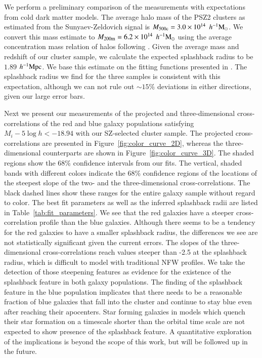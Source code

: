 \documentclass[iop, apjl, twocolappendix, numberedappendix]{emulateapj}
\def\mpch{h^{-1}{\rm Mpc}}
\def\msunh{h^{-1}{\rm M_{\odot}}}
\begin{document}
We perform a preliminary comparison of the measurements with
expectations from cold dark matter models. The average halo mass of
the PSZ2 clusters as estimated from the Sunyaev-Zeldovich signal
is $M_{\rm 500c}=3.0\times10^{14}$ $\msunh$. We convert this mass
estimate to $M_{\rm 200m}=6.2\times10^{14}$ $\msunh$ using the average
concentration mass relation of halos following
\citet{HuKravtsov:2003}. Given the average mass and redshift of our
cluster sample, we calculate the expected splashback radius to be
$1.89$ $\mpch$. We base this estimate on the fitting functions
presented in \citet{more2015splashback}. The splashback radius we
find for the three samples is consistent with this expectation,
although we can not rule out $\sim 15\%$ deviations in either directions,
given our large error bars.

Next we present our measurements of the projected and
three-dimensional cross-correlations of the red and blue galaxy populations
satisfying $M_{i}-5\log h<-18.94$ with our SZ-selected cluster
sample. The projected cross-correlations are presented in Figure~\ref{fig:color_curve_2D},
whereas the three-dimensional counterparts are shown in 
Figure~\ref{fig:color_curve_3D}. The shaded regions show
the 68\% confidence intervals from our fits. The vertical, shaded
bands with different colors indicate the 68\% confidence regions of
the locations of the steepest slope of the two- and the
three-dimensional cross-correlations. The black dashed lines show
these ranges for the entire galaxy sample without regard to color.
The best fit parameters as well as the inferred splashback radii are
listed in Table~\ref{tab:fit_parameters}. We
see that the red galaxies have a steeper cross-correlation profile
than the blue galaxies. Although there seems to be  a tendency for the red
galaxies to have a smaller splashback radius, the differences we see
are not statistically significant given the current errors. The
slopes of the three-dimensional cross-correlations reach values
steeper than -2.5 at the splashback radius, which is difficult to model with
traditional NFW profiles. We take the detection of those steepening features 
as evidence for the existence of the splashback feature in both galaxy populations.
The finding of the splashback feature in the blue population implicates that
there needs to be a reasonable fraction of blue galaxies that fall
into the cluster and continue to stay blue even after reaching their
apocenters. Star forming galaxies in models which quench their star
formation on a timescale shorter than the orbital time scale are
not expected to show presence of the splashback feature. A
quantitative exploration of the implications is beyond the scope of
this work, but will be followed up in the future.
\end{document}
